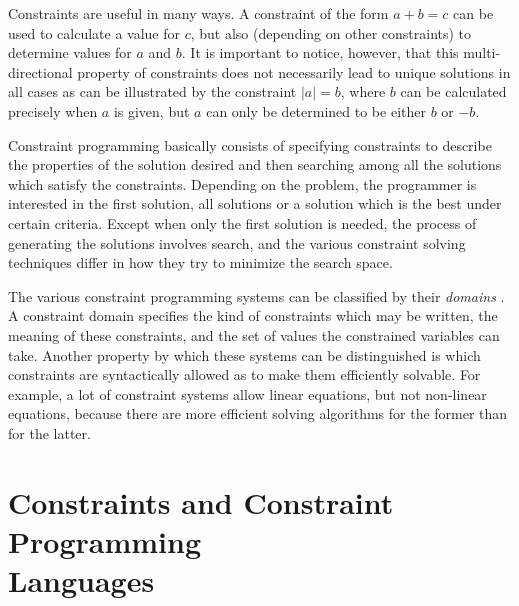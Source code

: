 Constraints are useful in many ways.  A constraint of the form $a+b=c$
can be used to calculate a value for $c$, but also (depending on other
constraints) to determine values for $a$ and $b$.  It is important to
notice, however, that this multi-directional property of constraints
does not necessarily lead to unique solutions in all cases as can be
illustrated by the constraint $|a|=b$, where $b$ can be calculated
precisely when $a$ is given, but $a$ can only be determined to be
either $b$ or $-b$.

Constraint programming basically consists of specifying constraints to
describe the properties of the solution desired and then searching
among all the solutions which satisfy the constraints.  Depending on
the problem, the programmer is interested in the first solution, all
solutions or a solution which is the best under certain criteria.
Except when only the first solution is needed, the process of
generating the solutions involves search, and the various constraint
solving techniques differ in how they try to minimize the search
space.

The various constraint programming systems can be classified by their
{\em domains}%
.  A constraint domain specifies the kind of constraints
which may be written, the meaning of these constraints, and the set of
values the constrained variables can take.  Another property by which
these systems can be distinguished is which constraints are
syntactically allowed as to make them efficiently solvable.  For
example, a lot of constraint systems allow linear equations, but not
non-linear equations, because there are more efficient solving
algorithms for the former than for the latter.




\section[Constraints and Constraint Programming Languages]{Constraints and Constraint Programming\\Languages}


